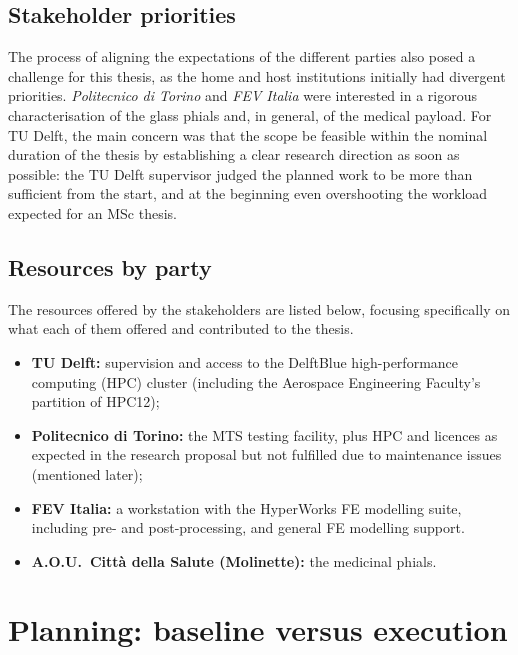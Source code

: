 \subsection{Stakeholder priorities}
The process of aligning the expectations of the different parties also posed a challenge for this thesis, as the home and host institutions initially had divergent priorities. \textit{Politecnico di Torino} and \textit{FEV Italia} were interested in a rigorous characterisation of the glass phials and, in general, of the medical payload. For TU Delft, the main concern was that the scope be feasible within the nominal duration of the thesis by establishing a clear research direction as soon as possible: the TU Delft supervisor judged the planned work to be more than sufficient from the start, and at the beginning even overshooting the workload expected for an MSc thesis.
 
\subsection{Resources by party}
The resources offered by the stakeholders are listed below, focusing specifically on what each of them offered and contributed to the thesis.
\begin{itemize}
    \item \textbf{TU Delft:} supervision and access to the DelftBlue high-performance computing (HPC) cluster (including the Aerospace Engineering Faculty's partition of HPC12);
    \item \textbf{Politecnico di Torino:} the MTS testing facility, plus HPC and licences as expected in the research proposal but not fulfilled due to maintenance issues (mentioned later);
    \item \textbf{FEV Italia:} a workstation with the HyperWorks FE modelling suite, including pre- and post-processing, and general FE modelling support.
    \item \textbf{A.O.U.\ Città della Salute (Molinette):} the medicinal phials.
\end{itemize}
 
 

\section{Planning: baseline versus execution}
\label{sec:pm-planning}
 
